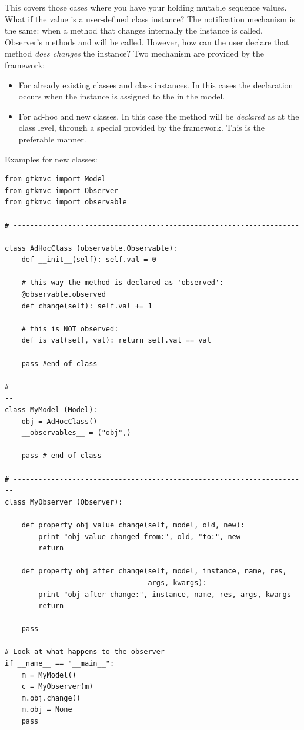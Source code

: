 This covers those cases where you have your \OPS holding mutable
sequence values. What if the value is a user-defined class instance?
The notification mechanism is the same: when a method 
that changes internally the instance is called, Observer's methods
 and  will be called. However, how can the user
declare that method  \emph{does changes} the instance?
Two mechanism are provided by the framework:
\begin{itemize}
\item For already existing classes and class instances. In this cases
  the declaration occurs when the instance is assigned to the \OP in
  the model.
\item For ad-hoc and new classes. In this case the method will be
  \emph{declared} as  at the class level, through a
  special  provided by the framework. This is the
  preferable manner. 
\end{itemize}

Examples for new classes:

{ \codesize 
\begin{verbatim} 
from gtkmvc import Model
from gtkmvc import Observer
from gtkmvc import observable

# ----------------------------------------------------------------------
class AdHocClass (observable.Observable):
    def __init__(self): self.val = 0

    # this way the method is declared as 'observed':
    @observable.observed 
    def change(self): self.val += 1

    # this is NOT observed:
    def is_val(self, val): return self.val == val

    pass #end of class

# ----------------------------------------------------------------------
class MyModel (Model):
    obj = AdHocClass()
    __observables__ = ("obj",)

    pass # end of class

# ----------------------------------------------------------------------
class MyObserver (Observer):

    def property_obj_value_change(self, model, old, new):
        print "obj value changed from:", old, "to:", new 
        return

    def property_obj_after_change(self, model, instance, name, res,
                                  args, kwargs):
        print "obj after change:", instance, name, res, args, kwargs
        return

    pass

# Look at what happens to the observer
if __name__ == "__main__":
    m = MyModel()
    c = MyObserver(m)
    m.obj.change()
    m.obj = None
    pass
\end{verbatim}
}


